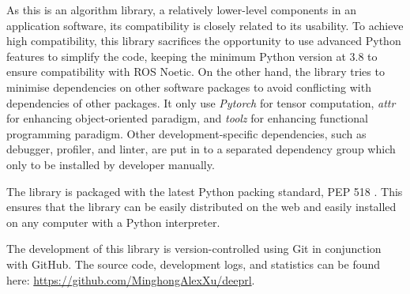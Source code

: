 As this is an algorithm library, a relatively lower-level components in an application software, its compatibility is closely related to its usability. To achieve high compatibility, this library sacrifices the opportunity to use advanced Python features to simplify the code, keeping the minimum Python version at 3.8 to ensure compatibility with ROS Noetic. On the other hand, the library tries to minimise dependencies on other software packages to avoid conflicting with dependencies of other packages. It only use \textit{Pytorch} for tensor computation, \textit{attr} for enhancing object-oriented paradigm, and \textit{toolz} for enhancing functional programming paradigm. Other development-specific dependencies, such as debugger, profiler, and linter, are put in to a separated dependency group which only to be installed by developer manually.

The library is packaged with the latest Python packing standard, PEP 518 \cite{ref:pep518}. This ensures that the library can be easily distributed on the web and easily installed on any computer with a Python interpreter.

The development of this library is version-controlled using Git in conjunction with GitHub. The source code, development logs, and statistics can be found here: \url{https://github.com/MinghongAlexXu/deeprl}.

